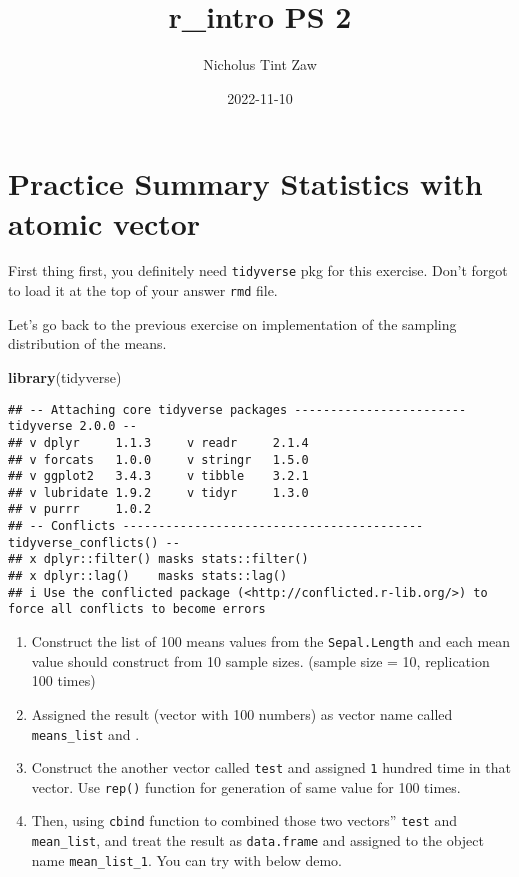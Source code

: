 \documentclass[
]{article}
\title{r\_intro PS 2}
\author{Nicholus Tint Zaw}
\date{2022-11-10}
\newenvironment{Shaded}{\begin{snugshade}}{\end{snugshade}}
\newcommand{\FunctionTok}[1]{\textcolor[rgb]{0.13,0.29,0.53}{\textbf{#1}}}
\newcommand{\NormalTok}[1]{#1}
\providecommand{\tightlist}{%
  \setlength{\itemsep}{0pt}\setlength{\parskip}{0pt}}
\begin{document}
\maketitle

\hypertarget{practice-summary-statistics-with-atomic-vector}{%
\section{Practice Summary Statistics with atomic
vector}\label{practice-summary-statistics-with-atomic-vector}}

First thing first, you definitely need \texttt{tidyverse} pkg for this
exercise. Don't forgot to load it at the top of your answer \texttt{rmd}
file.

Let's go back to the previous exercise on implementation of the sampling
distribution of the means.

\begin{Shaded}
\begin{Highlighting}[]
\FunctionTok{library}\NormalTok{(tidyverse)}
\end{Highlighting}
\end{Shaded}

\begin{verbatim}
## -- Attaching core tidyverse packages ------------------------ tidyverse 2.0.0 --
## v dplyr     1.1.3     v readr     2.1.4
## v forcats   1.0.0     v stringr   1.5.0
## v ggplot2   3.4.3     v tibble    3.2.1
## v lubridate 1.9.2     v tidyr     1.3.0
## v purrr     1.0.2     
## -- Conflicts ------------------------------------------ tidyverse_conflicts() --
## x dplyr::filter() masks stats::filter()
## x dplyr::lag()    masks stats::lag()
## i Use the conflicted package (<http://conflicted.r-lib.org/>) to force all conflicts to become errors
\end{verbatim}

\begin{enumerate}
\def\labelenumi{\arabic{enumi}.}
\setcounter{enumi}{1}
\tightlist
\item
  Construct the list of 100 means values from the \texttt{Sepal.Length}
  and each mean value should construct from 10 sample sizes. (sample
  size = 10, replication 100 times)
\item
  Assigned the result (vector with 100 numbers) as vector name called
  \texttt{means\_list} and .
\item
  Construct the another vector called \texttt{test} and assigned
  \texttt{1} hundred time in that vector. Use \texttt{rep()} function
  for generation of same value for 100 times.
\item
  Then, using \texttt{cbind} function to combined those two vectors''
  \texttt{test} and \texttt{mean\_list}, and treat the result as
  \texttt{data.frame} and assigned to the object name
  \texttt{mean\_list\_1}. You can try with below demo.
\end{enumerate}
\end{document}
